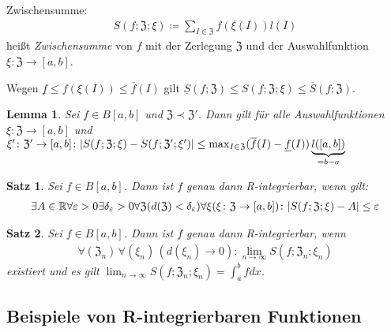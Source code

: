 \documentclass[ngerman,titlepage,twoside, parskip=half*]{scrreprt}
\newcommand*{\R}{\mathbb{R}}
\newcommand*{\ZZ}{\mathfrak{Z}}
\theoremstyle{break}
\newtheorem{lemma}{Lemma}
\newtheorem{theorem}{Satz}[section]
\theoremstyle{nonumberbreak}
\DeclarePairedDelimiter{\abs}{\lvert}{\rvert}
\begin{document}
Zwischensumme:
\begin{gather*}S(f;\ZZ;\xi)\coloneqq\sum_{I\in\ZZ} f(\xi(I)) l(I)\end{gather*}
heißt \emph{Zwischensumme} von $f$ mit der Zerlegung
$\ZZ$ und der Auswahlfunktion $\xi\colon\ZZ\rightarrow[a,b]$.

Wegen $\underline{f}\leq f(\xi(I))\leq\overline{f}(I)$ gilt $\underline{S}
(f;\ZZ)\leq S(f;\ZZ;\xi)\leq\overline{S}(f;\ZZ)$.

\begin{lemma}
  Sei $f\in B[a,b]$ und $\ZZ\prec\ZZ'$. Dann gilt für alle Auswahlfunktionen
  $\xi\colon\ZZ\rightarrow[a,b]$ und $\xi'\colon\ZZ'\rightarrow
  [a,b]\colon \abs{S(f;\ZZ;\xi)
  -S(f;\ZZ';\xi')}\leq\max_{I\in\ZZ} (\overline{f}(I)-\underline{f}(I))
  \underbrace{l([a,b])}_{=b-a}$
\end{lemma}

\begin{theorem}
  Sei $f\in B[a,b]$. Dann ist $f$ genau dann R-integrierbar, wenn gilt:
  \begin{gather*}\exists A\in\R \forall\varepsilon>0 \exists\delta_\varepsilon>0
  \forall\ZZ(d(\ZZ)<\delta_\varepsilon) \forall \xi(\xi\colon\ZZ\rightarrow
  [a,b])\colon\abs{S(f;\ZZ;\xi)-A}\leq \varepsilon\end{gather*}
\end{theorem}

\begin{theorem}
  Sei $f\in B[a,b]$. Dann ist $f$ genau dann R-integrierbar, wenn
  \begin{gather*}\forall (\ZZ_n)\,\forall (\xi_n)\,(d(\xi_n)\rightarrow 0)\colon
  \lim_{n\rightarrow\infty} S(f;\ZZ_n;\xi_n)\end{gather*}
  existiert und es gilt $\lim_{n\rightarrow\infty} S(f;\ZZ_n;\xi_n)=\int_a^b
  fdx$.
\end{theorem}

\subsection{Beispiele von R-integrierbaren Funktionen}
\end{document}
